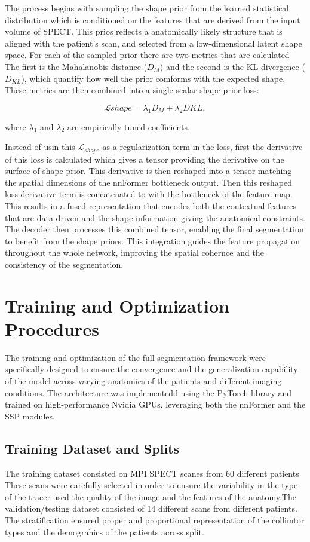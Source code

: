 The process begins with sampling the shape prior from the learned statistical distribution which is conditioned on the features that are derived from the input volume of SPECT. This prios reflects a anatomically likely structure that is aligned with the patient's scan, and selected from a low-dimensional latent shape space. For each of the sampled prior there are two metrics that are calculated The first is the Mahalanobis distance ($D_M$) and the second is the KL divergence ($D_{KL}$), which quantify how well the prior comforms with the expected shape. These metrics are then combined into a single scalar shape prior loss:

\begin{equation} \mathcal{L}{shape} = \lambda_1 D_M + \lambda_2 D{KL}, \end{equation}

where $\lambda_1$ and $\lambda_2$ are empirically tuned coefficients.

Instead of usin this $\mathcal{L}_{shape}$ as a regularization term in the loss, first the derivative of this loss is calculated which gives a tensor providing the derivative on the surface of shape prior. This derivative is then reshaped into a tensor matching the spatial dimensions of the nnFormer bottleneck output. Then this reshaped loss derivative term is concatenated to with the bottleneck of the feature map. This results in a fused representation that encodes both the contextual features that are data driven and the shape information giving the anatomical constraints. The decoder then processes this combined tensor, enabling the final segmentation to benefit from the shape priors. This integration guides the feature propagation throughout the whole network, improving the spatial cohernce and the consistency of the segmentation.



\section{Training and Optimization Procedures}
The training and optimization of the full segmentation framework were specifically designed to ensure the convergence and the generalization capability of the model across varying anatomies of the patients and different imaging conditions. The architecture was implementedd using the PyTorch library and trained on high-performance Nvidia GPUs, leveraging both the nnFormer and the SSP modules.

\subsection{Training Dataset and Splits}
The training dataset consisted on MPI SPECT scanes from 60 different patients These scans were carefully selected in order to ensure the variability in the type of the tracer used the quality of the image and the features of the anatomy.The validation/testing dataset consisted of 14 different scans from different patients. The stratification ensured proper and proportional representation of the collimtor types and the demograhics of the patients across split.

